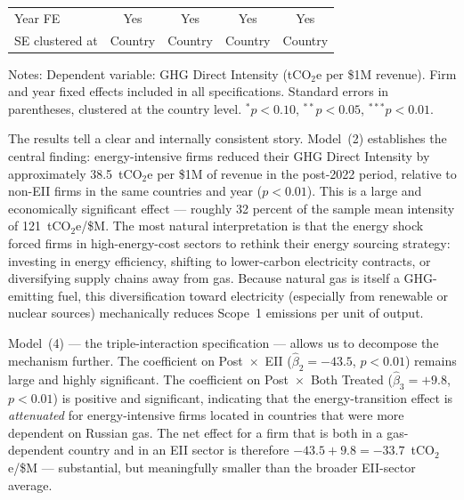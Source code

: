 \documentclass[authoryear,preprint,review,12pt]{elsarticle}
\begin{document}
\begin{table}[H]
\begin{tabular}{lcccc}
Year FE        & Yes     & Yes     & Yes     & Yes \\
SE clustered at & Country & Country & Country & Country \\
\bottomrule
\end{tabular}
\begin{tablenotes}
\small
\item Notes: Dependent variable: GHG Direct Intensity (tCO$_2$e per \$1M revenue). Firm and year fixed effects included in all specifications. Standard errors in parentheses, clustered at the country level. $^{*}p<0.10$, $^{**}p<0.05$, $^{***}p<0.01$.
\end{tablenotes}
\end{table}

The results tell a clear and internally consistent story. Model~(2) establishes the central finding: energy-intensive firms reduced their GHG Direct Intensity by approximately 38.5~tCO$_2$e per \$1M of revenue in the post-2022 period, relative to non-EII firms in the same countries and year ($p < 0.01$). This is a large and economically significant effect --- roughly 32 percent of the sample mean intensity of 121~tCO$_2$e/\$M. The most natural interpretation is that the energy shock forced firms in high-energy-cost sectors to rethink their energy sourcing strategy: investing in energy efficiency, shifting to lower-carbon electricity contracts, or diversifying supply chains away from gas. Because natural gas is itself a GHG-emitting fuel, this diversification toward electricity (especially from renewable or nuclear sources) mechanically reduces Scope~1 emissions per unit of output.

Model~(4) --- the triple-interaction specification --- allows us to decompose the mechanism further. The coefficient on Post~$\times$~EII ($\hat\beta_2 = -43.5$, $p<0.01$) remains large and highly significant. The coefficient on Post~$\times$~Both Treated ($\hat\beta_3 = +9.8$, $p<0.01$) is positive and significant, indicating that the energy-transition effect is \textit{attenuated} for energy-intensive firms located in countries that were more dependent on Russian gas. The net effect for a firm that is both in a gas-dependent country and in an EII sector is therefore $-43.5 + 9.8 = -33.7$~tCO$_2$e/\$M --- substantial, but meaningfully smaller than the broader EII-sector average.
\end{document}
